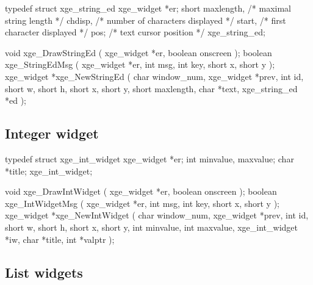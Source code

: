 \begin{listingC}
typedef struct xge_string_ed {
    xge_widget *er;
    short maxlength,  /* maximal string length */
          chdisp,     /* number of characters displayed */
          start,      /* first character displayed */
          pos;        /* text cursor position */
  } xge_string_ed;

void xge_DrawStringEd ( xge_widget *er, boolean onscreen );
boolean xge_StringEdMsg ( xge_widget *er,
                          int msg, int key, short x, short y );
xge_widget *xge_NewStringEd ( char window_num, xge_widget *prev,
                    int id,
                    short w, short h, short x, short y,
                    short maxlength, char *text, xge_string_ed *ed );
\end{listingC}


\subsection{Integer widget}

\begin{listingC}
typedef struct xge_int_widget {
    xge_widget *er;
    int        minvalue, maxvalue;
    char       *title;
  } xge_int_widget;

void xge_DrawIntWidget ( xge_widget *er, boolean onscreen );
boolean xge_IntWidgetMsg ( xge_widget *er,
                           int msg, int key, short x, short y );
xge_widget *xge_NewIntWidget ( char window_num, xge_widget *prev,
                    int id,
                    short w, short h, short x, short y,
                    int minvalue, int maxvalue,
                    xge_int_widget *iw, char *title, int *valptr );
\end{listingC}


\newpage
\subsection{List widgets}

